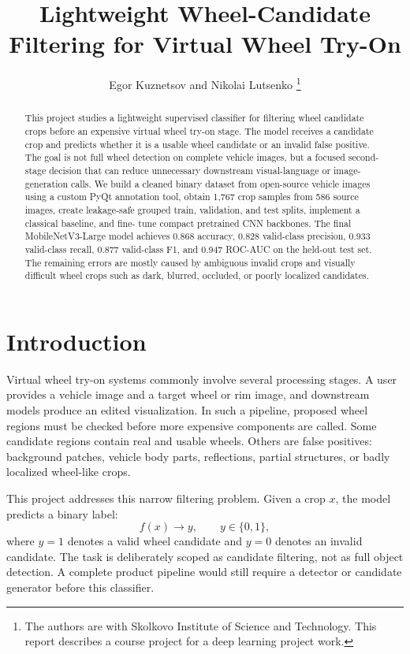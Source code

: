 \documentclass[letterpaper, 10 pt]{IEEEconf}
\title{\LARGE \bf
Lightweight Wheel-Candidate Filtering for Virtual Wheel Try-On
}
\author{
Egor Kuznetsov and Nikolai Lutsenko%
\thanks{The authors are with Skolkovo Institute of Science and Technology.
This report describes a course project for a deep learning project work.}
}
\begin{document}
\maketitle
\thispagestyle{empty}
\pagestyle{empty}

\begin{abstract}
This project studies a lightweight supervised classifier for filtering wheel
candidate crops before an expensive virtual wheel try-on stage. The model
receives a candidate crop and predicts whether it is a usable wheel candidate
or an invalid false positive. The goal is not full wheel detection on complete
vehicle images, but a focused second-stage decision that can reduce unnecessary
downstream visual-language or image-generation calls. We build a cleaned binary
dataset from open-source vehicle images using a custom PyQt annotation tool,
obtain 1,767 crop samples from 586 source images, create leakage-safe grouped
train, validation, and test splits, implement a classical baseline, and fine-
tune compact pretrained CNN backbones. The final MobileNetV3-Large model
achieves 0.868 accuracy, 0.828 valid-class precision, 0.933 valid-class recall,
0.877 valid-class F1, and 0.947 ROC-AUC on the held-out test set. The remaining
errors are mostly caused by ambiguous invalid crops and visually difficult
wheel crops such as dark, blurred, occluded, or poorly localized candidates.
\end{abstract}

\section{Introduction}

Virtual wheel try-on systems commonly involve several processing stages. A user
provides a vehicle image and a target wheel or rim image, and downstream models
produce an edited visualization. In such a pipeline, proposed wheel regions
must be checked before more expensive components are called. Some candidate
regions contain real and usable wheels. Others are false positives: background
patches, vehicle body parts, reflections, partial structures, or badly localized
wheel-like crops.

This project addresses this narrow filtering problem. Given a crop $x$, the
model predicts a binary label:
\begin{equation}
    f(x) \rightarrow y,\qquad y \in \{0,1\},
\end{equation}
where $y=1$ denotes a valid wheel candidate and $y=0$ denotes an invalid
candidate. The task is deliberately scoped as candidate filtering, not as full
object detection. A complete product pipeline would still require a detector or
candidate generator before this classifier.
\end{document}
